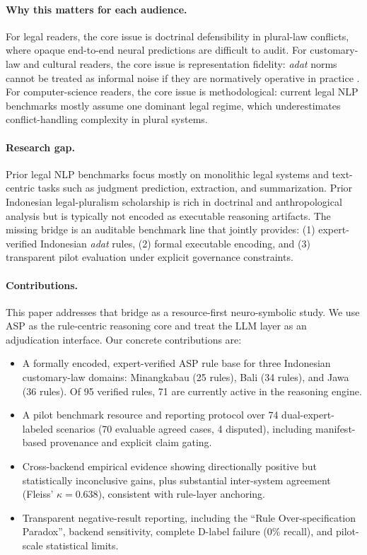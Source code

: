 \documentclass[11pt]{article}
\begin{document}
\paragraph{Why this matters for each audience.}
For legal readers, the core issue is doctrinal defensibility in plural-law conflicts, where opaque end-to-end neural predictions are difficult to audit. For customary-law and cultural readers, the core issue is representation fidelity: \textit{adat} norms cannot be treated as informal noise if they are normatively operative in practice \cite{hooker1978adat,burns2004leiden}. For computer-science readers, the core issue is methodological: current legal NLP benchmarks mostly assume one dominant legal regime, which underestimates conflict-handling complexity in plural systems.

\paragraph{Research gap.}
Prior legal NLP benchmarks focus mostly on monolithic legal systems and text-centric tasks such as judgment prediction, extraction, and summarization. Prior Indonesian legal-pluralism scholarship is rich in doctrinal and anthropological analysis but is typically not encoded as executable reasoning artifacts. The missing bridge is an auditable benchmark line that jointly provides: (1) expert-verified Indonesian \textit{adat} rules, (2) formal executable encoding, and (3) transparent pilot evaluation under explicit governance constraints.

\paragraph{Contributions.}
This paper addresses that bridge as a resource-first neuro-symbolic study. We use ASP as the rule-centric reasoning core and treat the LLM layer as an adjudication interface. Our concrete contributions are:
\begin{itemize}[nosep]
  \item A formally encoded, expert-verified ASP rule base for three Indonesian customary-law domains: Minangkabau (25 rules), Bali (34 rules), and Jawa (36 rules). Of 95 verified rules, 71 are currently active in the reasoning engine.
  \item A pilot benchmark resource and reporting protocol over 74 dual-expert-labeled scenarios (70 evaluable agreed cases, 4 disputed), including manifest-based provenance and explicit claim gating.
  \item Cross-backend empirical evidence showing directionally positive but statistically inconclusive gains, plus substantial inter-system agreement (Fleiss' $\kappa = 0.638$), consistent with rule-layer anchoring.
  \item Transparent negative-result reporting, including the ``Rule Over-specification Paradox'', backend sensitivity, complete D-label failure (0\% recall), and pilot-scale statistical limits.
\end{itemize}
\end{document}
